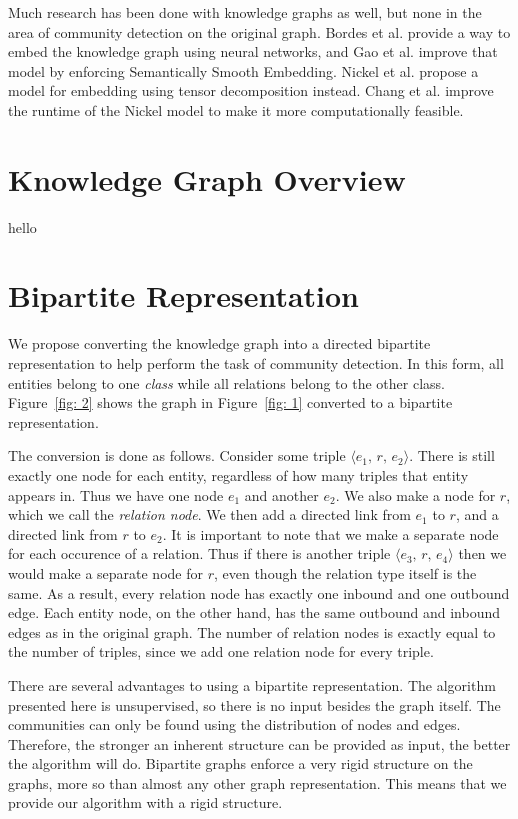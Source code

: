 \documentclass[12pt]{article}
\begin{document}
Much research has been done with knowledge graphs as well, but none in the area
of community detection on the original graph. Bordes et al.\cite{Bordes2013}
provide a way to embed the knowledge graph using neural networks, and Gao et
al.\cite{Gao2015} improve that model by enforcing Semantically Smooth Embedding.
Nickel et al.\cite{Nickel2011} propose a model for embedding using tensor decomposition
instead. Chang et al.\cite{Chang2014} improve the runtime of the Nickel model to
make it more computationally feasible.

\section{Knowledge Graph Overview}
\label{Knowledge Graph Overview}

hello

\section{Bipartite Representation}
\label{Bipartite Representation}

We propose converting the knowledge graph into a directed bipartite
representation to help perform the task of community detection. In this form,
all entities belong to one \textit{class} while all relations belong to the
other class. Figure~\ref{fig: 2} shows the graph in Figure~\ref{fig: 1} converted to a
bipartite representation.

The conversion is done as follows. Consider some triple $\langle e_1,\,r,\,e_2
\rangle$. There is still exactly one node for each entity, regardless of how
many triples that entity appears in. Thus we have one node $e_1$ and another
$e_2$. We also make a node for $r$, which we call the \textit{relation node}. We
then add a directed link from $e_1$ to $r$, and a directed link from $r$ to
$e_2$. It is important to note that we make a separate node for each occurence
of a relation. Thus if there is another triple $\langle e_3,\,r,\,e_4 \rangle$
then we would make a separate node for $r$, even though the relation type itself
is the same. As a result, every relation node has exactly one inbound and one
outbound edge. Each entity node, on the other hand, has the same outbound and
inbound edges as in the original graph. The number of relation nodes is exactly
equal to the number of triples, since we add one relation node for every triple.

There are several advantages to using a bipartite representation. The algorithm
presented here is unsupervised, so there is no input besides the graph itself.
The communities can only be found using the distribution of nodes and edges.
Therefore, the stronger an inherent structure can be provided as input, the
better the algorithm will do. Bipartite graphs enforce a very rigid structure on
the graphs, more so than almost any other graph representation. This means that
we provide our algorithm with a rigid structure.
\end{document}

